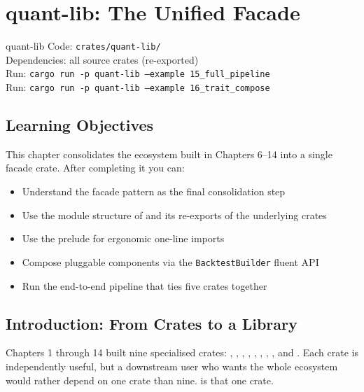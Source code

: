
\chapter{quant-lib: The Unified Facade}
\label{ch:quant-lib}

\begin{companioncode}{quant-lib}
Code: \texttt{crates/quant-lib/}\\
Dependencies: all source crates (re-exported)\\
Run: \texttt{cargo run -p quant-lib --example 15\_full\_pipeline}\\
Run: \texttt{cargo run -p quant-lib --example 16\_trait\_compose}
\end{companioncode}

\section{Learning Objectives}

This chapter consolidates the ecosystem built in Chapters 6--14 into a
single facade crate. After completing it you can:

\begin{itemize}
    \item Understand the facade pattern as the final consolidation step
    \item Use the module structure of  and its re-exports of the underlying crates
    \item Use the prelude for ergonomic one-line imports
    \item Compose pluggable components via the \texttt{BacktestBuilder} fluent API
    \item Run the end-to-end pipeline that ties five crates together
\end{itemize}

\section{Introduction: From Crates to a Library}

Chapters 1 through 14 built nine specialised crates: ,
, , ,
, , ,
, and . Each crate
is independently useful, but a downstream user who wants the whole
ecosystem would rather depend on one crate than nine. 
is that one crate.

